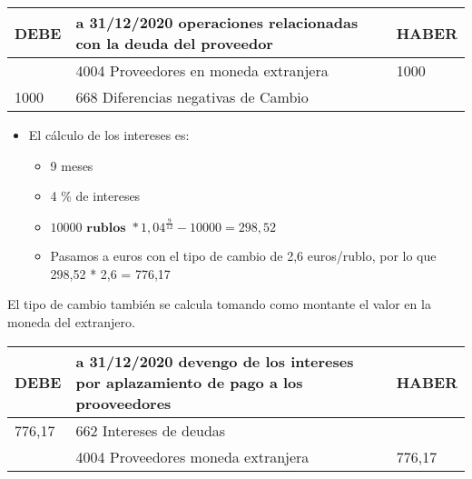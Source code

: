 \documentclass[a4paper,12pt]{article}
\newcommand{\fec}{31/12/}
\begin{document}
\begin{table}[H]
    \centering
    \begin{tabular}{|p{3cm}|p{6cm}|p{3cm}|}
    \hline
    \textbf{DEBE} & \textbf{a \fec2020 operaciones relacionadas con la deuda del proveedor} & \textbf{HABER} \\
    \hline
    & 4004 Proveedores en moneda extranjera& 1000\\
    \hline
    1000& 668 Diferencias negativas de Cambio& \\
    \hline
    \end{tabular}
\end{table}

\begin{itemize}
    \item El cálculo de los intereses es:
    \begin{itemize}
        \item 9 meses
        \item 4 \% de intereses
        \item $10000 \textbf{ rublos } * 1,04^{\frac{9}{12}} - 10000 = 298,52$
        \item Pasamos a euros con el tipo de cambio de 2,6 euros/rublo, por lo que 298,52 * 2,6 = 776,17
    \end{itemize}
\end{itemize}
\begin{tcolorbox}[colback=red!5!white,colframe=yellow!75!black, title={Nota}]
    El tipo de cambio también se calcula tomando como montante el valor en la moneda del extranjero.
\end{tcolorbox}

\begin{table}[H]
    \centering
    \begin{tabular}{|p{3cm}|p{6cm}|p{3cm}|}
    \hline
    \textbf{DEBE} & \textbf{a \fec2020 devengo de los intereses por aplazamiento de pago a los prooveedores} & \textbf{HABER} \\
    \hline
    776,17& 662 Intereses de deudas& \\
    \hline
    & 4004 Proveedores moneda extranjera& 776,17\\
    \hline
    \end{tabular}
\end{table}
\end{document}
